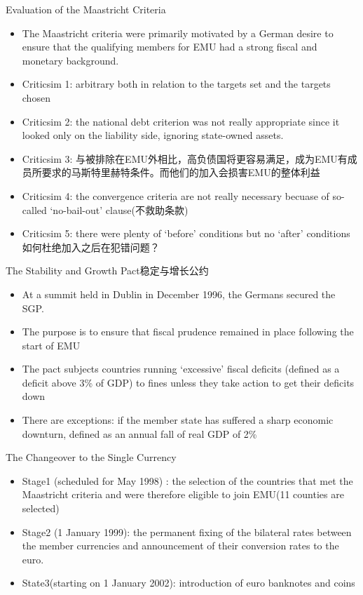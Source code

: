 \documentclass[10pt,hyperref={CJKbookmarks=true},xcolor=dvipsnames,aspectratio=169]{beamer}
\begin{document}
\begin{frame}{Evaluation of the Maastricht Criteria}

	\begin{itemize}
		\item The Maastricht criteria were primarily motivated by a German desire to ensure that
		the qualifying members for EMU had a strong fiscal and monetary background.
		\item Criticsim 1: arbitrary both in relation
		to the targets set and the targets chosen
		\item Criticsim 2: the national debt criterion was not really
		appropriate since it looked only on the liability side, ignoring state-owned assets.
		\item Criticsim 3: 与被排除在EMU外相比，高负债国将更容易满足，成为EMU有成员所要求的马斯特里赫特条件。而他们的加入会损害EMU的整体利益
		\item Criticsim 4: the convergence criteria are not really necessary becuase of so-called
		‘no-bail-out’ clause(不救助条款)
		\item Criticsim 5:  there were plenty of ‘before’ conditions but no ‘after’ conditions\\
		如何杜绝加入之后在犯错问题？
	\end{itemize}
\end{frame}

\begin{frame}{The Stability and Growth Pact稳定与增长公约}
	\begin{itemize}
		\item At a summit held in Dublin in December 1996, the Germans secured the SGP.
		\item The purpose is to ensure that fiscal prudence remained in place following the start of EMU
		\item The pact subjects countries running ‘excessive’ fiscal deficits (defined as a deficit above
		3\% of GDP) to fines unless they take action to get their deficits down
		\item There are exceptions: if the member state has suffered a sharp economic downturn, defined as an annual fall of real GDP of 2\%
	\end{itemize}
\end{frame}

\begin{frame}{The Changeover to the Single Currency}
\begin{itemize}
	\item Stage1 (scheduled for May 1998) :  the selection of the countries
	that met the Maastricht criteria and were therefore eligible to join EMU(11 counties are selected)
	\item Stage2 (1 January 1999): the permanent fixing of the bilateral
	rates between the member currencies and announcement of their conversion
	rates to the euro.
	\item State3(starting on 1 January 2002): introduction of euro banknotes
	and coins
\end{itemize}
\end{frame}
\end{document}
